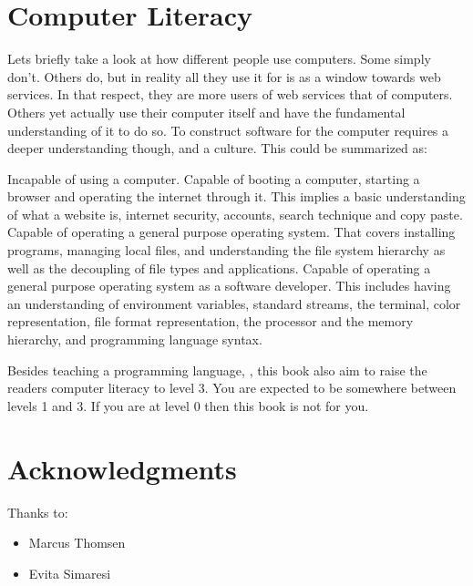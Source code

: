 \section{Computer Literacy}

Lets briefly take a look at how different people use computers. Some simply don't. Others do, but in reality all they use it for is as a window towards web services. In that respect, they are more users of web services that of computers. Others yet actually use their computer itself and have the fundamental understanding of it to do so. To construct software for the computer requires a deeper understanding though, and a culture. This could be summarized as:

\begin{itemize}
   Incapable of using a computer.
   Capable of booting a computer, starting a browser and operating the internet through it. This implies a basic understanding of what a website is, internet security, accounts, search technique and copy paste.
   Capable of operating a general purpose operating system. That covers installing programs, managing local files, and understanding the file system hierarchy as well as the decoupling of file types and applications.
   Capable of operating a general purpose operating system as a software developer. This includes having an understanding of environment variables, standard streams, the terminal, color representation, file format representation, the processor and the memory hierarchy, and programming language syntax.
\end{itemize}

Besides teaching a programming language, \csharp, this book also aim to raise the readers computer literacy to level 3. You are expected to be somewhere between levels 1 and 3. If you are at level 0 then this book is not for you.

\section{Acknowledgments}

Thanks to:
\begin{itemize}
  \item Marcus Thomsen
  \item Evita Simaresi
\end{itemize}

